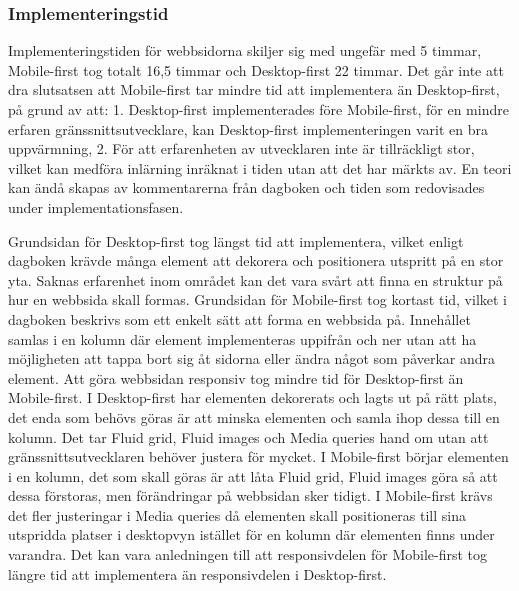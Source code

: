 \documentclass[11pt]{article}
\begin{document}
\subsubsection{Implementeringstid}
Implementeringstiden för webbsidorna skiljer sig med ungefär med 5 timmar, Mobile-first tog totalt 16,5 timmar och Desktop-first 22 timmar. Det går inte att dra slutsatsen att Mobile-first tar mindre tid att implementera än Desktop-first, på grund av att: 1. Desktop-first implementerades före Mobile-first, för en mindre erfaren gränssnittsutvecklare, kan Desktop-first implementeringen varit en bra uppvärmning, 2. För att erfarenheten av utvecklaren inte är tillräckligt stor, vilket kan medföra inlärning inräknat i tiden utan att det har märkts av. En teori kan ändå skapas av kommentarerna från dagboken och tiden som redovisades under implementationsfasen.

Grundsidan för Desktop-first tog längst tid att implementera, vilket enligt dagboken krävde många element att dekorera och positionera utspritt på en stor yta. Saknas erfarenhet inom området kan det vara svårt att finna en struktur på hur en webbsida skall formas. Grundsidan för Mobile-first tog kortast tid, vilket i dagboken beskrivs som ett enkelt sätt att forma en webbsida på. Innehållet samlas i en kolumn där element implementeras uppifrån och ner utan att ha möjligheten att tappa bort sig åt sidorna eller ändra något som påverkar andra element. Att göra webbsidan responsiv tog mindre tid för Desktop-first än Mobile-first. I Desktop-first har elementen dekorerats och lagts ut på rätt plats, det enda som behövs göras är att minska elementen och samla ihop dessa till en kolumn. Det tar Fluid grid, Fluid images och Media queries hand om utan att gränssnittsutvecklaren behöver justera för mycket. I Mobile-first börjar elementen i en kolumn, det som skall göras är att låta Fluid grid, Fluid images göra så att dessa förstoras, men förändringar på webbsidan sker tidigt. I Mobile-first krävs det fler justeringar i Media queries då elementen skall positioneras till sina utspridda platser i desktopvyn istället för en kolumn där elementen finns under varandra. Det kan vara anledningen till att responsivdelen för Mobile-first tog längre tid att implementera än responsivdelen i Desktop-first.
\end{document}
